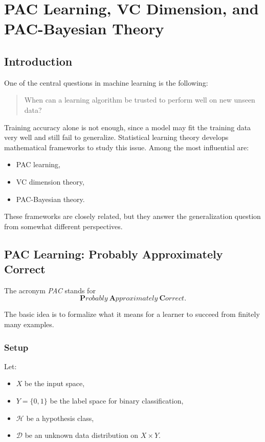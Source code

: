 \section{PAC Learning, VC Dimension, and PAC-Bayesian Theory}
\label{sec:pac-vc-pacbayes}

\subsection{Introduction}

One of the central questions in machine learning is the following:

\begin{quote}
When can a learning algorithm be trusted to perform well on new unseen data?
\end{quote}

Training accuracy alone is not enough, since a model may fit the training data very well and still fail to generalize. Statistical learning theory develops mathematical frameworks to study this issue. Among the most influential are:
\begin{itemize}
    \item PAC learning,
    \item VC dimension theory,
    \item PAC-Bayesian theory.
\end{itemize}

These frameworks are closely related, but they answer the generalization question from somewhat different perspectives.

\subsection{PAC Learning: Probably Approximately Correct}

The acronym \emph{PAC} stands for
\[
\textbf{P}robably \ \textbf{A}pproximately \ \textbf{C}orrect.
\]

The basic idea is to formalize what it means for a learner to succeed from finitely many examples.

\subsubsection{Setup}

Let:
\begin{itemize}
    \item \(X\) be the input space,
    \item \(Y=\{0,1\}\) be the label space for binary classification,
    \item \(\mathcal{H}\) be a hypothesis class,
    \item \(\mathcal{D}\) be an unknown data distribution on \(X \times Y\).
\end{itemize}

